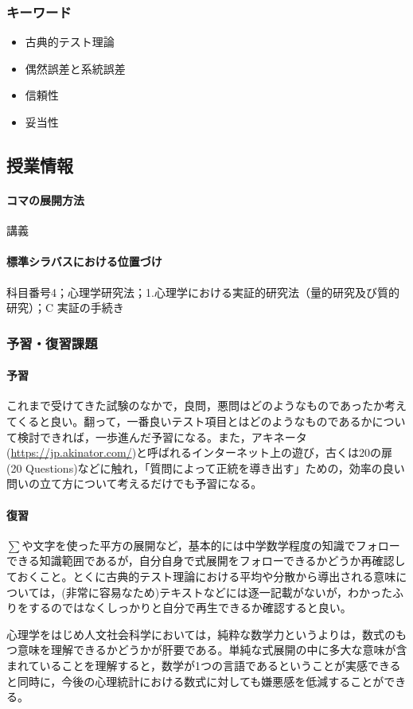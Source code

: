\subsubsection{キーワード}
\begin{itemize}
	\item 古典的テスト理論
	\item 偶然誤差と系統誤差
	\item 信頼性
	\item 妥当性
\end{itemize}
\subsection{授業情報}
\paragraph{コマの展開方法}
講義
\paragraph{標準シラバスにおける位置づけ}
科目番号4；心理学研究法；1.心理学における実証的研究法（量的研究及び質的研究）；C 実証の手続き
\subsubsection{予習・復習課題}
\paragraph{予習}
これまで受けてきた試験のなかで，良問，悪問はどのようなものであったか考えてくると良い。翻って，一番良いテスト項目とはどのようなものであるかについて検討できれば，一歩進んだ予習になる。また，アキネータ(\url{https://jp.akinator.com/})と呼ばれるインターネット上の遊び，古くは20の扉(20 Questions)などに触れ，「質問によって正統を導き出す」ための，効率の良い問いの立て方について考えるだけでも予習になる。
\paragraph{復習}
$\sum$や文字を使った平方の展開など，基本的には中学数学程度の知識でフォローできる知識範囲であるが，自分自身で式展開をフォローできるかどうか再確認しておくこと。とくに古典的テスト理論における平均や分散から導出される意味については，(非常に容易なため)テキストなどには逐一記載がないが，わかったふりをするのではなくしっかりと自分で再生できるか確認すると良い。

心理学をはじめ人文社会科学においては，純粋な数学力というよりは，数式のもつ意味を理解できるかどうかが肝要である。単純な式展開の中に多大な意味が含まれていることを理解すると，数学が1つの言語であるということが実感できると同時に，今後の心理統計における数式に対しても嫌悪感を低減することができる。
